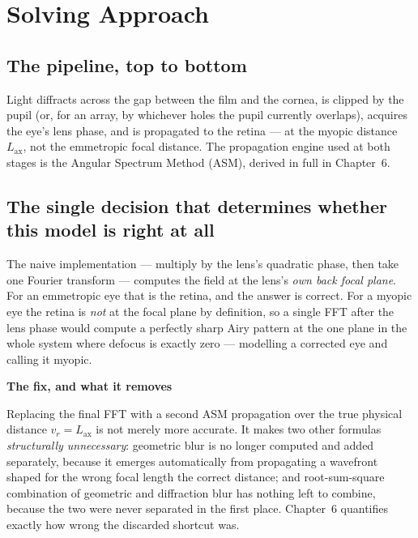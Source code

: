 \documentclass[11pt]{report}
\newenvironment{warnbox}[1]%
{\par\vspace{6pt}\begin{lrbox}{\wbsave}\begin{minipage}{0.88\textwidth}%
{\bfseries\color{warnred}#1}\par\vspace{4pt}\ignorespaces}%
{\end{minipage}\end{lrbox}%
\begin{center}\setlength{\fboxrule}{1.2pt}\setlength{\fboxsep}{7pt}%
\fcolorbox{warnred}{white}{\usebox{\wbsave}}\end{center}\vspace{6pt}\par}
\begin{document}
\chapter{Solving Approach}

\section{The pipeline, top to bottom}

\begin{center}
\end{center}

Light diffracts across the gap between the film and the cornea, is clipped by the pupil
(or, for an array, by whichever holes the pupil currently overlaps), acquires the eye's
lens phase, and is propagated to the retina --- at the myopic distance $L_{\text{ax}}$, not
the emmetropic focal distance. The propagation engine used at both stages is the Angular
Spectrum Method (ASM), derived in full in Chapter~6.

\section{The single decision that determines whether this model is right at all}

The naive implementation --- multiply by the lens's quadratic phase, then take one Fourier
transform --- computes the field at the lens's \emph{own back focal plane}. For an
emmetropic eye that is the retina, and the answer is correct. For a myopic eye the retina is
\emph{not} at the focal plane by definition, so a single FFT after the lens phase would
compute a perfectly sharp Airy pattern at the one plane in the whole system where defocus
is exactly zero --- modelling a corrected eye and calling it myopic.

\begin{warnbox}{The fix, and what it removes}
Replacing the final FFT with a second ASM propagation over the true physical distance
$v_r = L_{\text{ax}}$ is not merely more accurate. It makes two other formulas
\emph{structurally unnecessary}: geometric blur is no longer computed and added
separately, because it emerges automatically from propagating a wavefront shaped for the
wrong focal length the correct distance; and root-sum-square combination of geometric and
diffraction blur has nothing left to combine, because the two were never separated in the
first place. Chapter~6 quantifies exactly how wrong the discarded shortcut was.
\end{warnbox}
\end{document}
